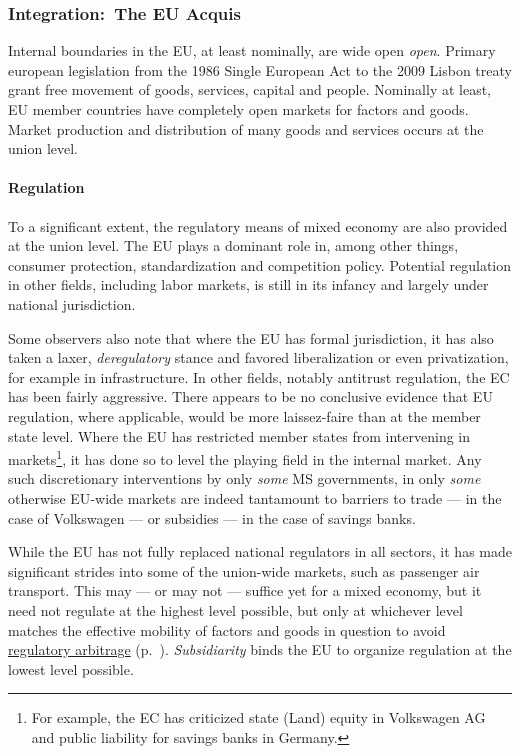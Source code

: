 \subsubsection[Integration]{Integration:\ The EU Acquis}
	\label{sec:EU-Acquis}
Internal boundaries in the \gls{EU}, at least nominally, are wide open \emph{open}.
Primary european legislation from the 1986 Single European Act to the 2009 Lisbon treaty grant free movement of goods, services, capital and people.
Nominally at least, \gls{EU} member countries have completely open markets for factors and goods.
Market production and distribution of many goods and services occurs at the union level.

\paragraph{Regulation}
To a significant extent, the regulatory means of mixed economy are also provided at the union level.
The \gls{EU} plays a dominant role in, among other things, consumer protection, standardization and competition policy.
Potential regulation in other fields, including labor markets, is still in its infancy and largely under national jurisdiction.

Some observers also note that where the \gls{EU} has formal jurisdiction, it has also taken a laxer, \emph{deregulatory} stance and favored liberalization or even privatization, for example in infrastructure.
In other fields, notably antitrust regulation, the \gls{EC} has been fairly aggressive.
There appears to be no conclusive evidence that \gls{EU} regulation, where applicable, would be more laissez-faire than at the member state level.
Where the \gls{EU} has restricted member states from intervening in markets\footnote{
	For example, the \gls{EC} has criticized state (Land) equity in Volkswagen AG and public liability for savings banks in Germany.},
it has done so to level the playing field in the internal market.
Any such discretionary interventions by only \emph{some} \gls{MS} governments, in only \emph{some} otherwise \gls{EU}-wide markets are indeed tantamount to barriers to trade --- in the case of Volkswagen --- or subsidies --- in the case of savings banks.

While the \gls{EU} has not fully replaced national regulators in all sectors, it has made significant strides into some of the union-wide markets, such as passenger air transport.
This may --- or may not --- suffice yet for a mixed economy, but it need not regulate at the highest level possible, but only at whichever level matches the effective mobility of factors and goods in question to avoid \hyperref[sec:regulatory]{regulatory arbitrage} (p.~\pageref{sec:regulatory}).
\emph{Subsidiarity} binds the \gls{EU} to organize regulation at the lowest level possible.

